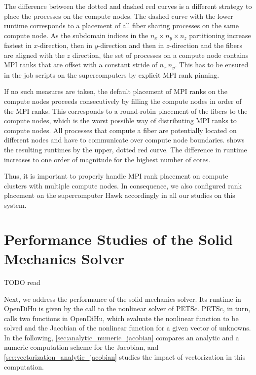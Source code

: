 The difference between the dotted and dashed red curves is a different strategy to place the processes on the compute nodes. The dashed curve with the lower runtime corresponds to a placement of all fiber sharing processes on the same compute node. As the subdomain indices in the $n_x \times n_y \times n_z$ partitioning increase fastest in $x$-direction, then in $y$-direction and then in $z$-direction and the fibers are aligned with the $z$ direction, the set of processes on a compute node contains MPI ranks that are offset with a constant stride of $n_x\,n_y$. This has to be ensured in the job scripts on the supercomputers by explicit MPI rank pinning.

If no such measures are taken, the default placement of MPI ranks on the compute nodes proceeds consecutively by filling the compute nodes in order of the MPI ranks. This corresponds to a round-robin placement of the fibers to the compute nodes, which is the worst possible way of distributing MPI ranks to compute nodes. All processes that compute a fiber are potentially located on different nodes and have to communicate over compute node boundaries.
 shows the resulting runtimes by the upper, dotted red curve. The difference in runtime increases to one order of magnitude for the highest number of cores.

Thus, it is important to properly handle MPI rank placement on compute clusters with multiple compute nodes. In consequence, we also configured rank placement on the supercomputer Hawk accordingly in all our studies on this system.



\section{Performance Studies of the Solid Mechanics Solver}

TODO read

Next, we address the performance of the solid mechanics solver. 
Its runtime in OpenDiHu is given by the call to the nonlinear solver of PETSc. PETSc, in turn, calls two functions in OpenDiHu, which evaluate the nonlinear function to be solved and the Jacobian of the nonlinear function for a given vector of unknowns.
In the following, \cref{sec:analytic_numeric_jacobian} compares an analytic and a numeric computation scheme for the Jacobian, and \cref{sec:vectorization_analytic_jacobian} studies the impact of vectorization in this computation.

